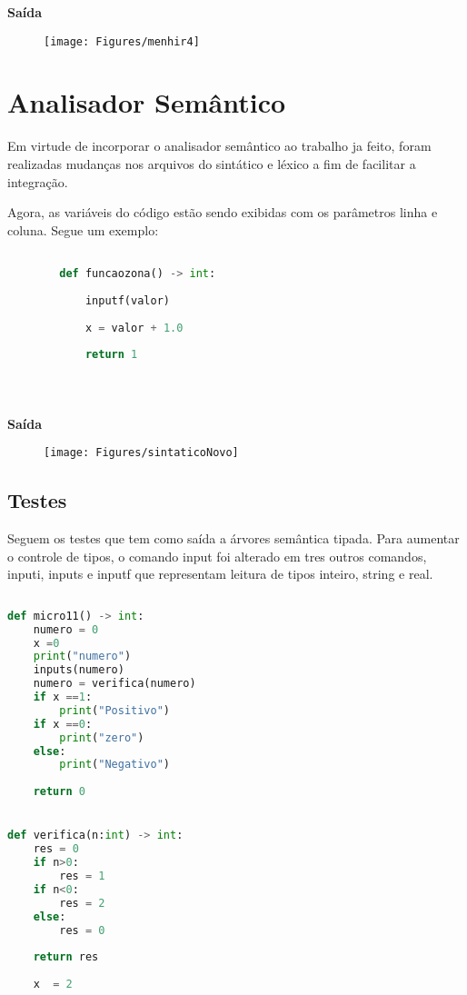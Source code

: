 \documentclass[hidelinks,12pt]{article}
\begin{document}
	\textbf{{\large Saída}}
	
	\begin{figure}[!h]
		\centering
		\texttt{[image: Figures/menhir4]}
	\end{figure}

	
	\section{Analisador Semântico}
	
	Em virtude de incorporar o analisador semântico ao trabalho ja feito, foram realizadas mudanças nos arquivos do sintático e léxico a fim de facilitar a integração.
	
	Agora, as variáveis do código estão sendo exibidas com os parâmetros linha e coluna. Segue um exemplo:
	
	
		\begin{lstlisting}[caption=sintatico.mli, language=python]

		def funcaozona() -> int:
	
			inputf(valor)
		
			x = valor + 1.0
			
			return 1
	
	
	
	\end{lstlisting}
	
	\newpage
	\textbf{{\large Saída}}
	
	\begin{figure}[!h]
		\centering
		\texttt{[image: Figures/sintaticoNovo]}
	\end{figure}
	
	\subsection{Testes}
	
	Seguem os testes que tem como saída a árvores semântica tipada. Para aumentar o controle de tipos, o comando input foi alterado em tres outros comandos, inputi, inputs e inputf que representam leitura de tipos inteiro, string e real.
	
			\begin{lstlisting}[caption=sintatico.mli, language=python]
	
def micro11() -> int:
	numero = 0
	x =0
	print("numero")
	inputs(numero)
	numero = verifica(numero)
	if x ==1:
		print("Positivo")
	if x ==0:
		print("zero")
	else:
		print("Negativo")
	
	return 0


def verifica(n:int) -> int:
	res = 0
	if n>0:
		res = 1
	if n<0:
		res = 2
	else:
		res = 0
	
	return res
	
	x  = 2

	
	
	
	\end{lstlisting}
	
\end{document}
